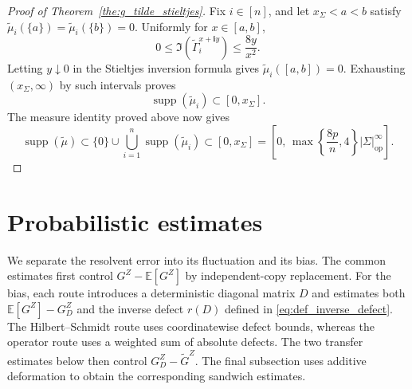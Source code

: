 \documentclass[EJP, preprint, NODS, nobera, nofontexpansion]{ejpecp}
\newcommand{\ii}{\mathbf{i}}
\DeclareMathOperator{\op}{op}
\begin{document}
\begin{proof}[Proof of Theorem~\ref{the:g_tilde_stieltjes}]
Fix \(i\in[n]\), and let \(x_\Sigma<a<b\) satisfy
\(\tilde\mu_i(\{a\})=\tilde\mu_i(\{b\})=0\).  Uniformly for \(x\in[a,b]\),
\[
    0\leq\Im(\tilde\Gamma_i^{x+\ii y})
    \leq\frac{8y}{x^2}.
\]
Letting \(y\downarrow0\) in the Stieltjes inversion formula gives
\(\tilde\mu_i([a,b])=0\).  Exhausting
\((x_\Sigma,\infty)\) by such intervals proves
\[
    \operatorname{supp}(\tilde\mu_i)\subset[0,x_\Sigma].
\]
The measure identity proved above now gives
\[
    \operatorname{supp}(\tilde\mu)
    \subset
    \{0\}\cup\bigcup_{i=1}^n\operatorname{supp}(\tilde\mu_i)
    \subset[0,x_\Sigma]
    =  \left[
          0,\,
          \max\left\{\frac{8p}{n},4\right\}
          |\Sigma|_{\op}^\infty
      \right].
\]
\end{proof}






































































\section{Probabilistic estimates}
\label{sec:probabilistic_results}

We separate the resolvent error into its fluctuation and its bias.
The common estimates first control $G^Z-\mathbb E[G^Z]$ by independent-copy
replacement. For the bias, each route introduces a deterministic diagonal matrix
\(D\) and estimates both \(\mathbb E[G^Z]-G_D^Z\) and the inverse defect
\(r(D)\) defined in \eqref{eq:def_inverse_defect}.
The Hilbert--Schmidt route uses coordinatewise defect bounds,
whereas the operator route uses a weighted sum of absolute defects.
The two transfer estimates below then control
\(G_D^Z-\widetilde G^Z\).
The final subsection uses additive deformation to obtain the
corresponding sandwich estimates.
\end{document}
